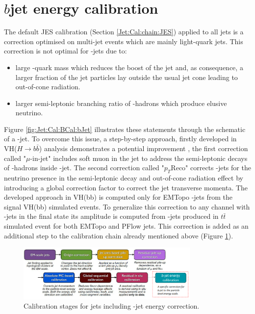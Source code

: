 \section{\texorpdfstring{$b$}-jet energy calibration}
\label{Jet:Cal:BCal}
The default JES calibration (Section \ref{Jet:Cal:chain:JES}) applied to all jets is a correction optimised on multi-jet events which are mainly light-quark jets. This correction is not optimal for \bq-jets due to:
\begin{itemize}
    \item large \bq-quark mass which reduces the boost of the jet and, as consequence, a larger fraction of the jet particles lay outside the usual jet cone leading to out-of-cone radiation.
    \item larger semi-leptonic branching ratio of \bq-hadrons which produce elusive neutrino.
\end{itemize}
Figure \ref{fig:Jet:Cal:BCal:bJet} illustrates these statements through the schematic of a \bq-jet. To overcome this issue, a step-by-step approach, firstly developed in VH($H\rightarrow b\bar{b}$) analysis demonstrates a potential improvement \cite{Vhbb}, the first correction called "$\mu$-in-jet" includes soft muon in the jet to address the semi-leptonic decays of \bq-hadrons inside \bq-jet. The second correction called "$p_T$Reco" corrects \bq-jets for the neutrino presence in the semi-leptonic decay and out-of-cone radiation effect by introducing a global correction factor to correct the jet transverse momenta. The developed approach in VH(bb) is computed only for EMTopo \bq-jets from the signal VH(bb) simulated events. To generalize this correction to any channel with \bq-jets in the final state its amplitude is computed from \bq-jets produced in $t\bar{t}$ simulated event for both EMTopo and PFlow jets. This correction is added as an additional step to the calibration chain already mentioned above (Figure \ref{fig:Jet:Cal:BCal:Chain}).
\begin{figure}[htbp]
    \centering
    \includegraphics[width=0.8\textwidth]{Ch4/Img/b_jet_chain.png}
    \begin{tcolorbox}[colback=black!5!white,colframe=white!75!black]
    \caption{Calibration stages for jets including \bq-jet energy correction.}
    \label{fig:Jet:Cal:BCal:Chain}
    \end{tcolorbox}
\end{figure}
